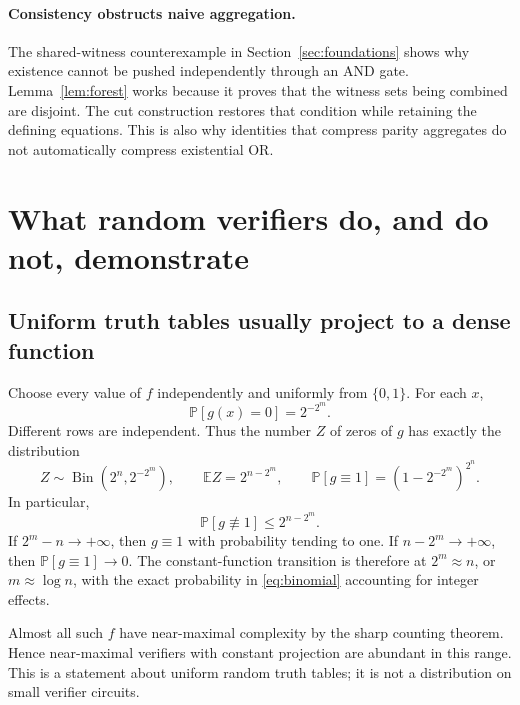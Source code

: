 \documentclass[11pt]{article}
\theoremstyle{definition}
\theoremstyle{remark}
\newcommand{\B}{\{0,1\}}
\newcommand{\E}{\mathbb{E}}
\newcommand{\Prb}{\mathbb{P}}
\begin{document}


\paragraph{Consistency obstructs naive aggregation.}
The shared-witness counterexample in Section~\ref{sec:foundations}
shows why existence cannot be pushed independently through an AND gate.
Lemma~\ref{lem:forest}
works because it proves that the witness sets being combined are
disjoint. The cut construction restores that condition while retaining
the defining equations. This is also why identities that compress
parity aggregates do not automatically compress existential OR.



\section{What random verifiers do, and do not, demonstrate}

\subsection{Uniform truth tables usually project to a dense function}

Choose every value of $f$ independently and uniformly from $\B$.
For each $x$,
\begin{equation}\label{eq:random-row}
 \Prb[g(x)=0]=2^{-2^m}.
\end{equation}
Different rows are independent. Thus the number $Z$ of zeros of $g$
has exactly the distribution
\begin{equation}\label{eq:binomial}
 Z\sim\operatorname{Bin}(2^n,2^{-2^m}),
 \qquad \E Z=2^{n-2^m},
 \qquad \Prb[g\equiv1]=(1-2^{-2^m})^{2^n}.
\end{equation}
In particular,
\[
 \Prb[g\not\equiv1]\le2^{n-2^m}.
\]
If $2^m-n\to+\infty$, then $g\equiv1$ with probability tending to
one. If $n-2^m\to+\infty$, then $\Prb[g\equiv1]\to0$.
The constant-function transition is therefore at $2^m\approx n$,
or $m\approx\log n$, with the exact probability in
\eqref{eq:binomial} accounting for integer effects.

Almost all such $f$ have near-maximal complexity by the sharp counting
theorem. Hence near-maximal verifiers with constant projection are
abundant in this range. This is a statement about uniform random truth
tables; it is not a distribution on small verifier circuits.
\end{document}
